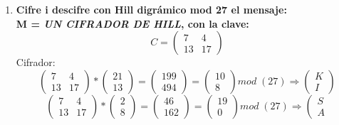 \documentclass{article}
\begin{document}
\begin{enumerate}
\item \textbf{Cifre i descifre con Hill digrámico mod 27 el mensaje:\\
M = \emph{UN CIFRADOR DE HILL},  con la clave:}
\begin{equation*}
    C= \left(
    \begin{array}{cc}
    7 & 4 \\
    13 & 17
    \end{array}
    \right)
\end{equation*}
Cifrador:
\begin{equation*}
    \left(
    \begin{array}{cc}
    7 & 4 \\
    13 & 17
    \end{array}
    \right) * \left(\begin{array}{c}
    21 \\
    13
    \end{array}
    \right)=\left(\begin{array}{c}
    199 \\
    494
    \end{array}
    \right) = \left(\begin{array}{c}
    10 \\
    8
    \end{array}
    \right) mod \; (27) \Rightarrow \left(\begin{array}{c}
    K \\
    I
    \end{array}
    \right)
\end{equation*}
\begin{equation*}
    \left(
    \begin{array}{cc}
    7 & 4 \\
    13 & 17
    \end{array}
    \right) * \left(\begin{array}{c}
    2 \\
    8
    \end{array}
    \right)=\left(\begin{array}{c}
    46 \\
    162
    \end{array}
    \right) = \left(\begin{array}{c}
    19 \\
    0
    \end{array}
    \right) mod\; (27) \Rightarrow \left(\begin{array}{c}
    S \\
    A

\end{array}
\end{equation*}
\end{enumerate}
\end{document}
